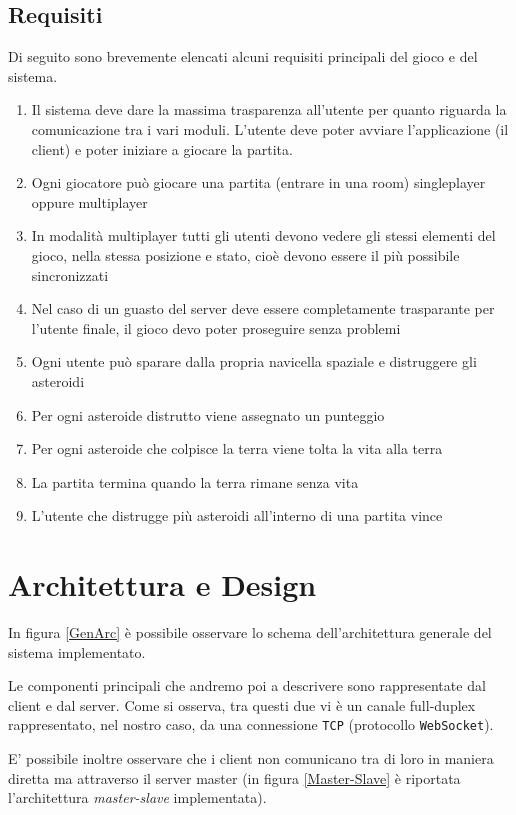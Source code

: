 \documentclass[paper=a4, fontsize=11pt]{scrartcl} %
\numberwithin{equation}{section} %
\numberwithin{figure}{section} %
\numberwithin{table}{section} %
\begin{document}
\subsection{Requisiti}
Di seguito sono brevemente elencati alcuni requisiti principali del gioco e del sistema.
\begin{enumerate}
\item Il sistema deve dare la massima trasparenza all'utente per quanto riguarda la comunicazione tra i vari moduli. L'utente deve poter avviare l'applicazione (il client) e poter iniziare a giocare la partita.
\item Ogni giocatore può giocare una partita (entrare in una room) singleplayer oppure multiplayer
\item In modalità multiplayer tutti gli utenti devono vedere gli stessi elementi del gioco, nella stessa posizione e stato, cioè devono essere il più possibile sincronizzati
\item Nel caso di un guasto del server deve essere completamente trasparante per l'utente finale, il gioco devo poter proseguire senza problemi
\item Ogni utente può sparare dalla propria navicella spaziale e distruggere gli asteroidi
\item Per ogni asteroide distrutto viene assegnato un punteggio
\item Per ogni asteroide che colpisce la terra viene tolta la vita alla terra
\item La partita termina quando la terra rimane senza vita
\item L'utente che distrugge più asteroidi all'interno di una partita vince
\end{enumerate}

\section{Architettura e Design}

In figura \ref{GenArc} è possibile osservare lo schema dell'architettura generale del sistema implementato.

Le componenti principali che andremo poi a descrivere sono rappresentate dal client e dal server. Come si osserva, tra questi due vi è un canale full-duplex rappresentato, nel nostro caso, da una connessione \texttt{TCP} (protocollo \texttt{WebSocket}).

E' possibile inoltre osservare che i client non comunicano tra di loro in maniera diretta ma attraverso il server master (in figura \ref{Master-Slave} è riportata l'architettura \textit{master-slave} implementata).
\end{document}
